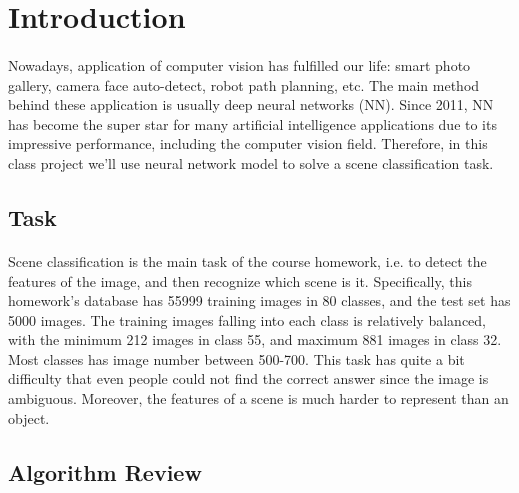 \documentclass{gapd}
\begin{document}
\maketitle


\section{Introduction}
\label{sec:Introduction}
\paragraph{}
	\lettrine{N}{}owadays, application of computer vision has fulfilled our life: smart photo gallery, camera face auto-detect, robot path planning, etc. The main method behind these application is usually deep neural networks (NN). Since 2011, NN has become the super star for many artificial intelligence applications due to its impressive performance, including the computer vision field. Therefore, in this class project we'll use neural network model to solve a scene classification task.  

\subsection{Task}
\paragraph{}
	Scene classification is the main task of the course homework, i.e. to detect the features of the image, and then recognize which scene is it. Specifically, this homework's database has 55999 training images in 80 classes, and the test set has 5000 images. The training images falling into each class is relatively balanced, with the minimum 212 images in class 55, and maximum 881 images in class 32. Most classes has image number between 500-700. This task has quite a bit difficulty that even people could not find the correct answer since the image is ambiguous. Moreover, the features of a scene is much harder to represent than an object. 

\subsection{Algorithm Review}
\end{document}
